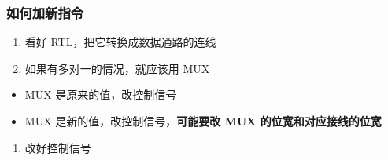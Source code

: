 \hypertarget{ux5982ux4f55ux52a0ux65b0ux6307ux4ee4}{%
\subsubsection{如何加新指令}\label{ux5982ux4f55ux52a0ux65b0ux6307ux4ee4}}

\begin{enumerate}
\def\labelenumi{\arabic{enumi}.}
\tightlist
\item
  看好 RTL，把它转换成数据通路的连线
\item
  如果有多对一的情况，就应该用 MUX
\end{enumerate}

\begin{itemize}
\tightlist
\item
  MUX 是原来的值，改控制信号
\item
  MUX 是新的值，改控制信号，\textbf{可能要改 MUX 的位宽和对应接线的位宽}
\end{itemize}

\begin{enumerate}
\def\labelenumi{\arabic{enumi}.}
\setcounter{enumi}{2}
\tightlist
\item
  改好控制信号
\end{enumerate}

